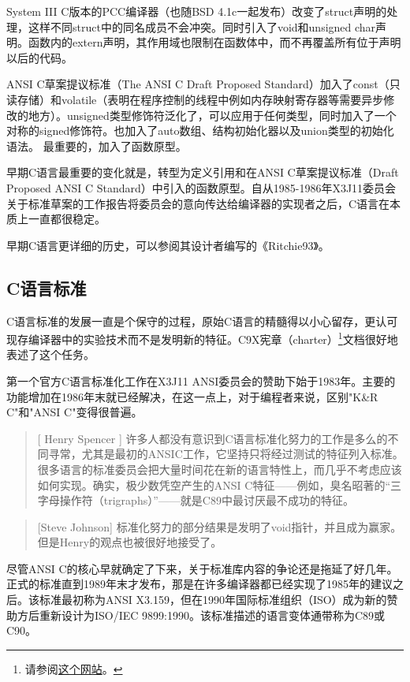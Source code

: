 \documentclass[12pt,oneside]{book}
\begin{document}
System III C版本的PCC编译器（也随BSD 4.1c一起发布）改变了struct声明的处理，这样不同struct中的同名成员不会冲突。同时引入了void和unsigned char声明。函数内的extern声明，其作用域也限制在函数体中，而不再覆盖所有位于声明以后的代码。

ANSI C草案提议标准（The ANSI C Draft Proposed Standard）加入了const（只读存储）和volatile（表明在程序控制的线程中例如内存映射寄存器等需要异步修改的地方）。unsigned类型修饰符泛化了，可以应用于任何类型，同时加入了一个对称的signed修饰符。也加入了auto数组、结构初始化器以及union类型的初始化语法。
最重要的，加入了函数原型。

早期C语言最重要的变化就是，转型为定义引用和在ANSI C草案提议标准（Draft Proposed ANSI C Standard）中引入的函数原型。自从1985-1986年X3J11委员会关于标准草案的工作报告将委员会的意向传达给编译器的实现者之后，C语言在本质上一直都很稳定。

早期C语言更详细的历史，可以参阅其设计者编写的《Ritchie93》。

\subsection{C语言标准}
C语言标准的发展一直是个保守的过程，原始C语言的精髓得以小心留存，更认可现存编译器中的实验技术而不是发明新的特征。C9X宪章（charter）\footnote{请参阅\href{http://anubis.dkuug.dk/JTC1/SC22/WG14/www/charter}{这个网站}。}文档很好地表述了这个任务。

第一个官方C语言标准化工作在X3J11 ANSI委员会的赞助下始于1983年。主要的功能增加在1986年末就已经解决，在这一点上，对于编程者来说，区别"K\&{}R C"和"ANSI C"变得很普遍。

\begin{quote}[ Henry Spencer 	]
许多人都没有意识到C语言标准化努力的工作是多么的不同寻常，尤其是最初的ANSIC工作，它坚持只将经过测试的特征列入标准。很多语言的标准委员会把大量时间花在新的语言特性上，而几乎不考虑应该如何实现。确实，极少数凭空产生的ANSI C特征——例如，臭名昭著的“三字母操作符（trigraphs）”——就是C89中最讨厌最不成功的特征。
\end{quote}

\begin{quote}[Steve Johnson]
标准化努力的部分结果是发明了void指针，并且成为赢家。但是Henry的观点也被很好地接受了。
\end{quote}

尽管ANSI C的核心早就确定了下来，关于标准库内容的争论还是拖延了好几年。正式的标准直到1989年末才发布，那是在许多编译器都已经实现了1985年的建议之后。该标准最初称为ANSI X3.159，但在1990年国际标准组织（ISO）成为新的赞助方后重新设计为ISO/IEC 9899:1990。该标准描述的语言变体通带称为C89或C90。
\end{document}
